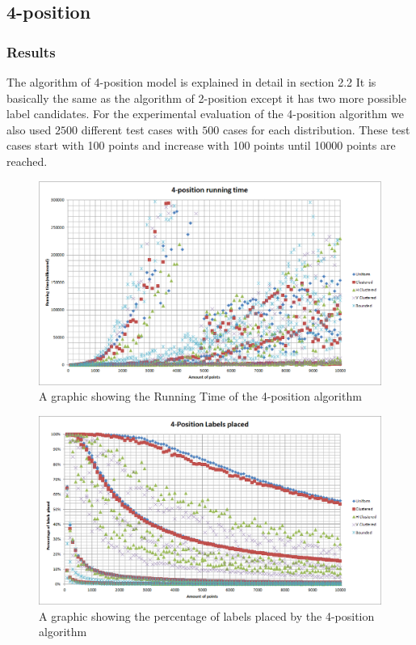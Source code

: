 \documentclass[crop=false,a4paper,oneside,11pt]{standalone}
\begin{document}
\subsection{4-position}
\subsubsection{Results}
The algorithm of 4-position model is explained in detail in section 2.2 It is basically the same as the algorithm of 2-position except it has two more possible label candidates. For the experimental evaluation of the 4-position algorithm we also used $2500$ different test cases with $500$ cases for each distribution. These test cases start with 100 points and increase with 100 points until 10000 points are reached.\\

 \begin{figure}[H]
 \centering
 \centerline{\includegraphics[scale = 0.5]{4PosRunningTime.png}}
 \caption{A graphic showing the Running Time of the 4-position algorithm}
 \end{figure}

 \begin{figure}[H]
 \centering
  \centerline{\includegraphics[scale = 0.5]{4PosLabelsPlaced.png}}
  \caption{A graphic showing the percentage of labels placed by the 4-position algorithm}
 \end{figure}
\end{document}
